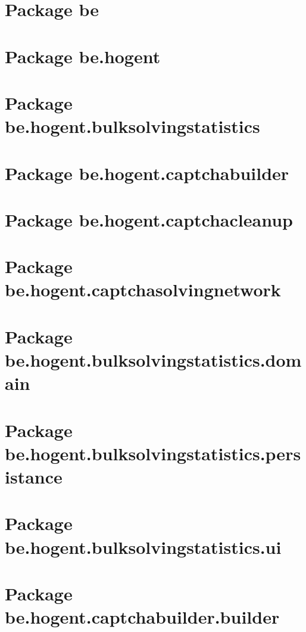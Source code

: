 
\section{Package be}

\section{Package be.hogent}

\section{Package be.hogent.bulksolvingstatistics}

\section{Package be.hogent.captchabuilder}

\section{Package be.hogent.captchacleanup}

\section{Package be.hogent.captchasolvingnetwork}

\section{Package be.hogent.bulksolvingstatistics.domain}

\section{Package be.hogent.bulksolvingstatistics.persistance}

\section{Package be.hogent.bulksolvingstatistics.ui}

\section{Package be.hogent.captchabuilder.builder}

